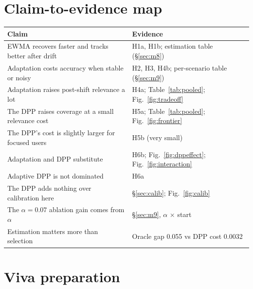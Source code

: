 \documentclass[11pt,a4paper]{article}
\begin{document}
\section{Claim-to-evidence map}\label{sec:map}
\begin{table}[h]\centering\small
\begin{tabularx}{\linewidth}{Xl}
\toprule
Claim & Evidence \\
\midrule
EWMA recovers faster and tracks better after drift & H1a, H1b; estimation table (\S\ref{sec:m8}) \\
Adaptation costs accuracy when stable or noisy & H2, H3, H4b; per-scenario table (\S\ref{sec:m9}) \\
Adaptation raises post-shift relevance a lot & H4a; Table~\ref{tab:pooled}; Fig.~\ref{fig:tradeoff} \\
The DPP raises coverage at a small relevance cost & H5a; Table~\ref{tab:pooled}; Fig.~\ref{fig:frontier} \\
The DPP's cost is slightly larger for focused users & H5b (very small) \\
Adaptation and DPP substitute & H6b; Fig.~\ref{fig:dppeffect}; Fig.~\ref{fig:interaction} \\
Adaptive DPP is not dominated & H6a \\
The DPP adds nothing over calibration here & \S\ref{sec:calib}; Fig.~\ref{fig:calib} \\
The $\alpha=0.07$ ablation gain comes from $\alpha$ & \S\ref{sec:m9}, $\alpha$ $\times$ start \\
Estimation matters more than selection & Oracle gap 0.055 vs DPP cost 0.0032 \\
\bottomrule
\end{tabularx}
\end{table}

\appendix
\section{Viva preparation}\label{sec:viva}
\end{document}
